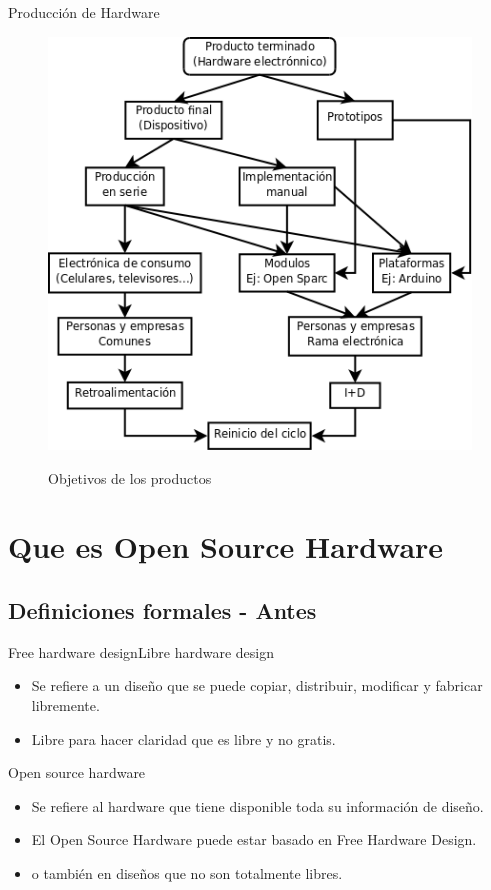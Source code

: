 \documentclass{beamer}
\begin{document}
\begin{frame}{Producción de Hardware}
  \begin{figure}
    \includegraphics[scale=0.3]{img/objetivos}
    \label{fig:objetivos}
    \caption{Objetivos de los productos}
  \end{figure}
\end{frame}
 
\section{Que es Open Source Hardware}



\subsection{Definiciones formales - Antes}

\begin{frame}{Free hardware design}{Libre hardware design}
  \begin{itemize}
  \item Se refiere a un diseño que se puede copiar, distribuir, modificar y fabricar libremente.
  \item Libre para hacer claridad que es libre y no gratis.
  \end{itemize}
\end{frame}

\begin{frame}{Open source hardware}
  \begin{itemize}
  \item Se refiere al hardware que tiene disponible toda su información de diseño.
  \item El Open Source Hardware puede estar basado en Free Hardware Design.
  \item o también en diseños que no son totalmente libres.
  \end{itemize}
\end{frame}
\end{document}
